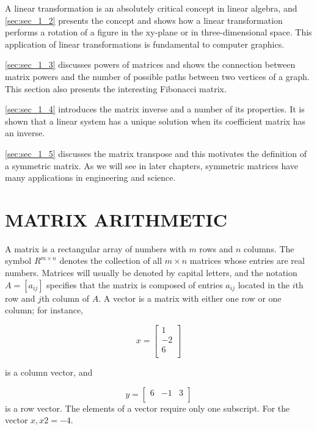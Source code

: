 \documentclass[../main.tex]{subfiles}
\begin{document}
A linear transformation is an absolutely critical concept in linear algebra, and  \autoref{sec:sec_1_2} presents the concept and shows how a linear transformation performs a rotation of a figure in the xy-plane or in three-dimensional space. This application
of linear transformations is fundamental to computer graphics. 

 \autoref{sec:sec_1_3} discusses powers of matrices and shows the connection between matrix powers and the number of possible paths between two vertices of a graph. This section also presents the interesting Fibonacci matrix.

\autoref{sec:sec_1_4} introduces the matrix inverse and a number of its properties. It is shown that a linear system has a unique solution when its coefficient matrix has an inverse.

\autoref{sec:sec_1_5} discusses the matrix transpose and this motivates the definition of a symmetric matrix. As we will see in later chapters, symmetric matrices have many applications in engineering and science.

\section[Matrix Arithmetic]{MATRIX ARITHMETIC}
\label{sec:sec_1_1}
A matrix is a rectangular array of numbers with $m$ rows and $n$ columns. The symbol $R^{m \times n}$ denotes the collection of all $m \times n$ matrices whose entries are real numbers. Matrices will usually be denoted by capital letters, and the notation $A = [a_{ij}]$ specifies that the matrix is composed of entries $a_{ij}$ located in the $i$th row and $j$th column of $A$.
A vector is a matrix with either one row or one column; for instance,

\begin{equation*}
	x = 
	\begin{bmatrix}
	1 \\
	-2 \\
	 6\\
	\end{bmatrix}
\end{equation*}

is a column vector, and

\begin{equation*}
y = 
\begin{bmatrix}
6 & -1 & 3\\
\end{bmatrix}
\end{equation*}
is a row vector. The elements of a vector require only one subscript. For the vector $x, x{2} = -4$.
\end{document}
